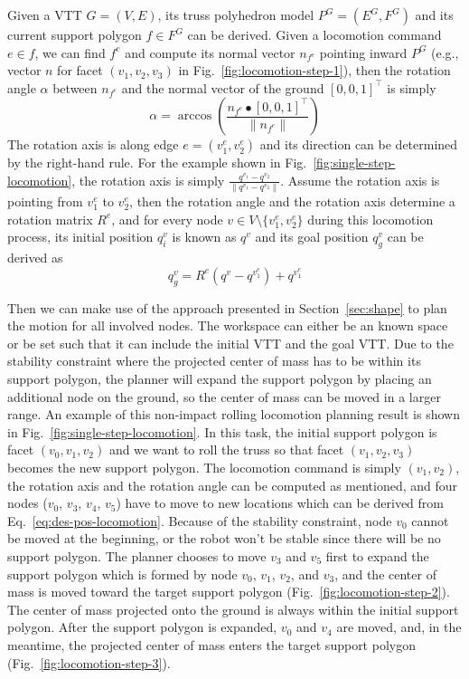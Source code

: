 \documentclass[journal]{IEEEtran}
\begin{document}
Given a VTT $G=(V,E)$, its truss polyhedron model $P^G=(E^G, F^G)$ and
its current support polygon $f\in F^G$ can be derived. Given a
locomotion command $e\in f$, we can find $f^e$ and compute its normal
vector $n_{f^e}$ pointing inward $P^G$ (e.g., vector $n$ for facet
$(v_1,v_2,v_3)$ in Fig.~\ref{fig:locomotion-step-1}), then the
rotation angle $\alpha$ between $n_{f^e}$ and the normal vector of the
ground $\left[0,0,1\right]^{\intercal}$ is simply
\begin{equation}
  \label{eq:rotating-angle}
  \alpha=\arccos\left(\frac{n_{f^e}\bullet\left[0,0,1\right]^{\intercal}}{\|n_{f^e}\|}\right)
\end{equation}
The rotation axis is along edge $e=(v_1^e, v_2^e)$ and its direction
can be determined by the right-hand rule. For the example shown in
Fig.~\ref{fig:single-step-locomotion}, the rotation axis is simply
$\frac{q^{v_1}-q^{v_2}}{\|q^{v_1}-q^{v_2}\|}$. Assume the rotation
axis is pointing from $v_1^e$ to $v_2^e$, then the rotation angle and
the rotation axis determine a rotation matrix $R^e$, and for every
node $v\in V\setminus \{v^e_1, v^e_2\}$ during this locomotion
process, its initial position $q_i^v$ is known as $q^v$ and its goal
position $q_g^v$ can be derived as
\begin{equation}
  \label{eq:des-pos-locomotion}
  q_g^v = R^e(q^v-q^{v_1^e}) + q^{v_1^e}
\end{equation}

Then we can make use of the approach presented in
Section~\ref{sec:shape} to plan the motion for all involved nodes. The
workspace can either be an known space or be set such that it can
include the initial VTT and the goal VTT. Due to the stability
constraint where the projected center of mass has to be within its
support polygon, the planner will expand the support polygon by
placing an additional node on the ground, so the center of mass can be
moved in a larger range. An example of this non-impact rolling
locomotion planning result is shown in
Fig.~\ref{fig:single-step-locomotion}. In this task, the initial
support polygon is facet $(v_0, v_1, v_2)$ and we want to roll the
truss so that facet $(v_1, v_2, v_3)$ becomes the new support
polygon. The locomotion command is simply $(v_1, v_2)$, the rotation
axis and the rotation angle can be computed as mentioned, and four
nodes ($v_0$, $v_3$, $v_4$, $v_5$) have to move to new locations which
can be derived from Eq.~\eqref{eq:des-pos-locomotion}. Because of the
stability constraint, node $v_0$ cannot be moved at the beginning, or
the robot won't be stable since there will be no support polygon. The
planner chooses to move $v_3$ and $v_5$ first to expand the support
polygon which is formed by node $v_0$, $v_1$, $v_2$, and $v_3$, and
the center of mass is moved toward the target support polygon
(Fig.~\ref{fig:locomotion-step-2}). The center of mass projected onto
the ground is always within the initial support polygon. After the
support polygon is expanded, $v_0$ and $v_4$ are moved, and, in the
meantime, the projected center of mass enters the target support
polygon (Fig.~\ref{fig:locomotion-step-3}).
\end{document}
